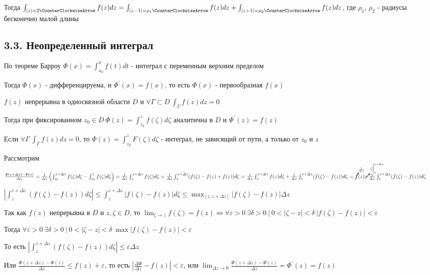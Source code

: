 Тогда $\int_{|z| = 2 \CounterClockwiseArrow} f(z) dz = \int_{|z - 1| = \rho_1 \CounterClockwiseArrow} f(z) dz + \int_{|z + 1| = \rho_2 \CounterClockwiseArrow} f(z) dz$,
где $\rho_1$, $\rho_2$ - радиусы бесконечно малой длины 

\subsection{3.3. Неопределенный интеграл}

\hypertarget{antiderivative}{}

\Mem По теореме Барроу $\Phi(x) = \int_{x_0}^x f(t) dt$ - интеграл с переменным верхним пределом

Тогда $\Phi(x)$ - дифференцируема, и $\Phi^\prime(x) = f(x)$, то есть $\Phi(x)$ - первообразная $f(x)$

\begin{MyTheorem}
    \Ths $f(z)$ непрерывна в односвязной области $D$ и $\forall \Gamma \subset D \ \int_\Gamma f(z) dz = 0$

    Тогда при фиксированном $z_0 \in D \ \Phi(z) = \int_{z_0}^z f(\zeta) d\zeta$ аналитична в $D$ и $\Phi^\prime(z) = f(z)$
\end{MyTheorem}

\begin{MyProof}
    Если $\forall \Gamma \ \int_\Gamma f(z) dz = 0$, то $\Phi(z) = \int_{z_0}^z F(\zeta) d\zeta$ - интеграл, не зависящий от пути, а только от $z_0$ и $z$

    Рассмотрим $\frac{\Phi(z + \Delta z) - \Phi(z)}{\Delta z} = \frac{1}{\Delta z} \left(\int_{z_0}^{z + \Delta z} f(\zeta) d\zeta - \int_{z_0}^z f(\zeta) d\zeta\right) = 
    \frac{1}{\Delta z} \int_z^{z + \Delta z} f(\zeta) d\zeta = \frac{1}{\Delta z} \int_z^{z + \Delta z} (f(\zeta) - f(z) + f(z))d\zeta = 
    \frac{1}{\Delta z} \int_z^{z + \Delta z} f(z) d\zeta + \frac{1}{\Delta z} \int_z^{z + \Delta z} (f(\zeta) - f(z))d\zeta = 
    \cancelto{\frac{1}{\Delta z}}  f(z) \cancelto{\zeta \Big|_{z}^{z + \Delta z}} + \frac{1}{\Delta z} \int_z^{z + \Delta z} (f(\zeta) - f(z))d\zeta$

    $\left|\int_z^{z + \Delta z} (f(\zeta) - f(z)) d\zeta\right| \leq \int_z^{z + \Delta z} |f(\zeta) - f(z)| d\zeta \leq \max_{[z, z + \Delta z]} |f(\zeta) - f(z)| \Delta z$

    Так как $f(z)$ непрерывна в $D$ и $z, \zeta \in D$, то $\lim_{\zeta \to z} f(\zeta) = f(z) \Longleftrightarrow 
    \forall \varepsilon > 0 \ \exists \delta > 0 \ | \ 0 < |\zeta - z| < \delta \ |f(\zeta) - f(z)| < \varepsilon$

    Тогда $\forall \varepsilon > 0 \ \exists \delta > 0 \ | \ 0 < |\zeta - z| < \delta \ \max |f(\zeta) - f(z)| < \varepsilon$

    То есть $\left|\int_z^{z + \Delta z} (f(\zeta) - f(z)) d\zeta \right| \leq \varepsilon \Delta z$

    Или $\frac{\Phi(z + \Delta z) - \Phi(z)}{\Delta z} \leq f(z) + \varepsilon$, то есть $\left|\frac{\Delta \Phi}{\Delta z} - f(z)\right| < \varepsilon$,
    или $\lim_{\Delta z \to 0} \frac{\Phi(z + \Delta z) - \Phi(z)}{\Delta z} = \Phi^\prime(z) = f(z)$
\end{MyProof}

